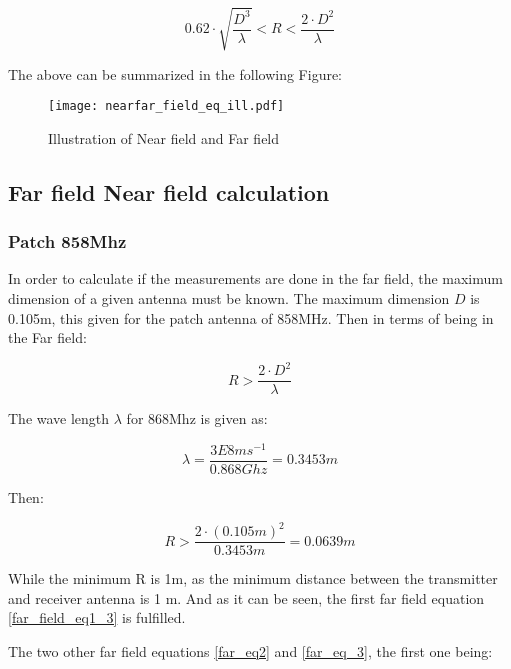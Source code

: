 \begin{equation}
0.62 \cdot \sqrt{\frac{D^{3}}{\lambda}} < R < \frac{2 \cdot D^{2}}{\lambda}
\label{far_field_eq1_2}
\end{equation}


The above can be summarized in the following Figure:

\begin{figure}[H]
\centering
\texttt{[image: nearfar\_field\_eq\_ill.pdf]}
\caption{Illustration of Near field and Far field \citep{farnear_field1}}
\label{nearfarf_eq_ill}
\end{figure}


\subsection{Far field Near field calculation}

\subsubsection{Patch 858Mhz}

In order to calculate if the measurements are done in the far field, the maximum dimension of a given antenna must be known. The maximum dimension $D$ is 0.105m, this given for the patch antenna of 858MHz. Then in terms of being in the Far field:

\begin{equation}
R > \frac{2 \cdot D^{2}}{\lambda}
\label{far_field_eq1_3}
\end{equation}



The wave length $\lambda$ for 868Mhz is given as:

\begin{equation}
\lambda = \frac{3E8 ms^{-1}}{0.868 Ghz} = 0.3453m
\end{equation}

Then:

\begin{equation}
R> \frac{2 \cdot (0.105m)^{2}}{0.3453m} = 0.0639 m 
\end{equation} 

While the minimum R is 1m, as the minimum distance between the transmitter and receiver antenna is 1 m. And as it can be seen, the first far field equation \ref{far_field_eq1_3} is fulfilled. 

The two other far field equations \ref{far_eq2} and \ref{far_eq_3}, the first one being:

